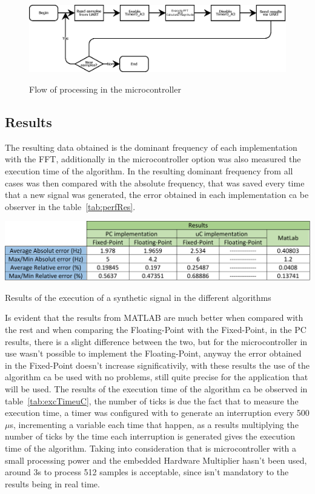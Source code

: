 \begin{figure}[]
    \centering
    \includegraphics[width=1\textwidth]{Chapters/6CHP/Figures/uCDataProc.eps}
    \caption{Flow of processing in the microcontroller}{}
    \label{fig:dataProcuC}
\end{figure}
\subsection{Results}
The resulting data obtained is the dominant frequency of each implementation with the FFT, additionally in the microcontroller option was also measured the execution time of the algorithm. In the resulting dominant frequency from all cases was then compared with the absolute frequency, that was saved every time that a new signal was generated, the error obtained in each implementation ca be observer in the table~\ref{tab:perfRes}.
\begin{table}
    \centering
    \includegraphics[width=1\textwidth]{Chapters/6CHP/Figures/performanceAlgorithm.pdf}
    \caption{Results of the execution of a synthetic signal in the different algorithms}
    \label{tab:perfRes}
\end{table}
Is evident that the results from MATLAB are much better when compared with the rest and when comparing the Floating-Point with the Fixed-Point, in the PC results, there is a slight difference between the two, but for the microcontroller in use wasn't possible to implement the Floating-Point, anyway the error obtained in the Fixed-Point doesn't increase significativily, with these results the use of the algorithm ca be used with no problems, still quite precise for the application that will be used. The results of the execution time of the algorithm ca be observed in table~\ref{tab:excTimeuC}, the number of ticks is due the fact that to measure the execution time, a timer was configured with to generate an interruption every 500$\mu$s, incrementing a variable each time that happen, as a results multiplying the number of ticks by the time each interruption is generated gives the execution time of the algorithm. Taking into consideration that is microcontroller with a small processing power and the embedded Hardware Multiplier hasn't been used, around 3s to process 512 samples is acceptable, since isn't mandatory to the results being in real time.  
